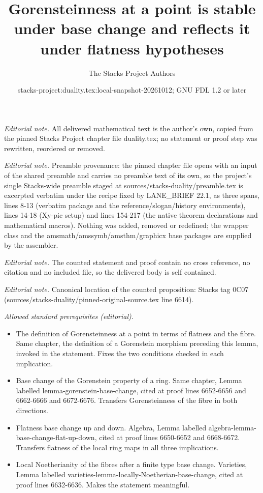 \documentclass[10pt,a4paper]{amsart}
\title{Gorensteinness at a point is stable under base change and reflects it under flatness hypotheses}
\author{The Stacks Project Authors}
\date{stacks-project:duality.tex:local-snapshot-20261012; GNU FDL 1.2 or later}
\theoremstyle{plain}
\theoremstyle{definition}
\theoremstyle{remark}
\numberwithin{equation}{subsection}
\begin{document}
\maketitle
\noindent\textit{Editorial note.} All delivered mathematical text is the author's own, copied from the pinned Stacks Project chapter file duality.tex; no statement or proof step was rewritten, reordered or removed.\par\medskip
\noindent\textit{Editorial note.} Preamble provenance: the pinned chapter file opens with an input of the shared preamble and carries no preamble text of its own, so the project's single Stacks-wide preamble staged at sources/stacks-duality/preamble.tex is excerpted verbatim under the recipe fixed by LANE\_BRIEF 22.1, as three spans, lines 8-13 (verbatim package and the reference/slogan/history environments), lines 14-18 (Xy-pic setup) and lines 154-217 (the native theorem declarations and mathematical macros). Nothing was added, removed or redefined; the wrapper class and the amsmath/amssymb/amsthm/graphicx base packages are supplied by the assembler.\par\medskip
\noindent\textit{Editorial note.} The counted statement and proof contain no cross reference, no citation and no included file, so the delivered body is self contained.\par\medskip
\noindent\textit{Editorial note.} Canonical location of the counted proposition: Stacks tag 0C07 (sources/stacks-duality/pinned-original-source.tex line 6614).\par\medskip
\noindent\textit{Allowed standard prerequisites (editorial).}\begin{itemize}
\item The definition of Gorensteinness at a point in terms of flatness and the fibre. Same chapter, the definition of a Gorenstein morphism preceding this lemma, invoked in the statement. Fixes the two conditions checked in each implication.
\item Base change of the Gorenstein property of a ring. Same chapter, Lemma labelled lemma-gorenstein-base-change, cited at proof lines 6652-6656 and 6662-6666 and 6672-6676. Transfers Gorensteinness of the fibre in both directions.
\item Flatness base change up and down. Algebra, Lemma labelled algebra-lemma-base-change-flat-up-down, cited at proof lines 6650-6652 and 6668-6672. Transfers flatness of the local ring maps in all three implications.
\item Local Noetherianity of the fibres after a finite type base change. Varieties, Lemma labelled varieties-lemma-locally-Noetherian-base-change, cited at proof lines 6632-6636. Makes the statement meaningful.
\end{itemize}\medskip
\end{document}
